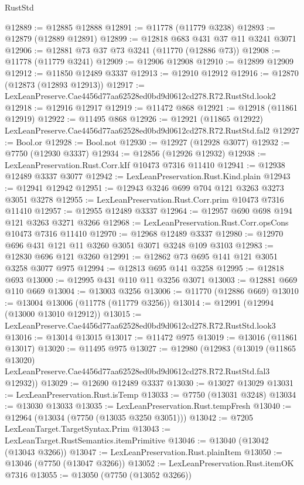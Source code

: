 \begin{lexlean}{RustStd}
\begin{coremodule}
@12889 := @12885 @12888
@12891 := @11778 (@11779 @3238)
@12893 := @12879 (@12889 @12891)
@12899 := @12818 @683 @431 @37 @11 @3241 @3071
@12906 := @12881 @73 @37 @73 @3241 (@11770 (@12886 @73))
@12908 := @11778 (@11779 @3241)
@12909 := @12906 @12908
@12910 := @12899 @12909
@12912 := @11850 @12489 @3337
@12913 := @12910 @12912
@12916 := @12870 (@12873 (@12893 @12913))
@12917 := LexLeanPreserve.Cae4456d77aa62528ed0bd9d0612cd278.R72.RustStd.look2
@12918 := @12916 @12917
@12919 := @11472 @868
@12921 := @12918 (@11861 @12919)
@12922 := @11495 @868
@12926 := @12921 (@11865 @12922) LexLeanPreserve.Cae4456d77aa62528ed0bd9d0612cd278.R72.RustStd.fal2
@12927 := Bool.or
@12928 := Bool.not
@12930 := @12927 (@12928 @3077)
@12932 := @7750 (@12930 @3337)
@12934 := @12856 (@12926 @12932)
@12938 := LexLeanPreservation.Rust.Corr.kIf @10473 @7316 @11410
@12941 := @12938 @12489 @3337 @3077
@12942 := LexLeanPreservation.Rust.Kind.plain
@12943 := @12941 @12942
@12951 := @12943 @3246 @699 @704 @121 @3263 @3273 @3051 @3278
@12955 := LexLeanPreservation.Rust.Corr.prim @10473 @7316 @11410
@12957 := @12955 @12489 @3337
@12964 := @12957 @690 @698 @194 @121 @3263 @3271 @3266
@12968 := LexLeanPreservation.Rust.Corr.opsCons @10473 @7316 @11410
@12970 := @12968 @12489 @3337
@12980 := @12970 @696 @431 @121 @11 @3260 @3051 @3071 @3248 @109 @3103
@12983 := @12830 @696 @121 @3260
@12991 := @12862 @73 @695 @141 @121 @3051 @3258 @3077 @975
@12994 := @12813 @695 @141 @3258
@12995 := @12818 @693
@13000 := @12995 @431 @110 @11 @3256 @3071
@13003 := @12881 @669 @110 @669
@13004 := @13003 @3256
@13006 := @11770 (@12886 @669)
@13010 := @13004 @13006 (@11778 (@11779 @3256))
@13014 := @12991 (@12994 (@13000 @13010 @12912))
@13015 := LexLeanPreserve.Cae4456d77aa62528ed0bd9d0612cd278.R72.RustStd.look3
@13016 := @13014 @13015
@13017 := @11472 @975
@13019 := @13016 (@11861 @13017)
@13020 := @11495 @975
@13027 := @12980
    (@12983
      (@13019
        (@11865 @13020)
        LexLeanPreserve.Cae4456d77aa62528ed0bd9d0612cd278.R72.RustStd.fal3
        @12932))
@13029 := @12690 @12489 @3337
@13030 := @13027 @13029
@13031 := LexLeanPreservation.Rust.isTemp
@13033 := @7750 (@13031 @3248)
@13034 := @13030 @13033
@13035 := LexLeanPreservation.Rust.tempFresh
@13040 := @12964 (@13034 (@7750 (@13035 @3250 @3051)))
@13042 := @7205 LexLeanTarget.TargetSyntax.Prim
@13043 := LexLeanTarget.RustSemantics.itemPrimitive
@13046 := @13040 (@13042 (@13043 @3266))
@13047 := LexLeanPreservation.Rust.plainItem
@13050 := @13046 (@7750 (@13047 @3266))
@13052 := LexLeanPreservation.Rust.itemOK @7316
@13055 := @13050 (@7750 (@13052 @3266))

\end{coremodule}
\end{lexlean}

